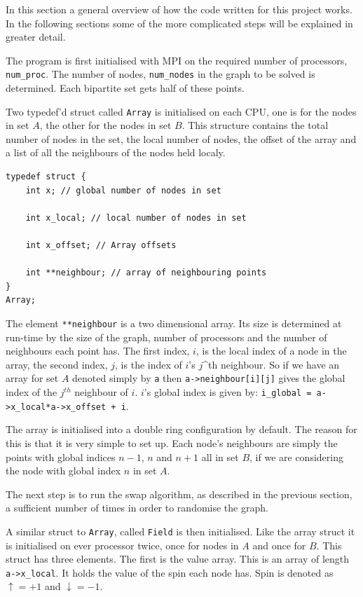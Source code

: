 \documentclass[pdftex,12pt,a4paper]{article}
\begin{document}
In this section a general overview of how the code written for this project works. In the following sections some of the more complicated steps will be explained in greater detail.

The program is first initialised with MPI on the required number of processors, \verb|num_proc|. The number of nodes, \verb|num_nodes| in the graph to be solved is determined. Each bipartite set gets half of these points.

Two typedef'd struct called \verb|Array| is initialised on each CPU, one is for the nodes in set $A$, the other for the nodes in set $B$. This structure contains the total number of nodes in the set, the local number of nodes, the offset of the array and a list of all the neighbours of the nodes held localy.

\begin{lstlisting}
typedef struct {
	int x; // global number of nodes in set

	int x_local; // local number of nodes in set

	int x_offset; // Array offsets

	int **neighbour; // array of neighbouring points
}
Array;
\end{lstlisting}

The element \verb|**neighbour| is a two dimensional array. Its size is determined at run-time by the size of the graph, number of processors and the number of neighbours each point has. The first index, $i$, is the local index of a node in the array, the second index, $j$, is the index of $i$'s $j$^{th} neighbour. So if we have an array for set $A$ denoted simply by \verb|a| then \verb|a->neighbour[i][j]| gives the global index of the $j^{th}$ neighbour of $i$. $i$'s global index is given by: \verb|i_global = a->x_local*a->x_offset + i|.

The array is initialised into a double ring configuration by default. The reason for this is that it is very simple to set up. Each node's neighbours are simply the points with global indices $n-1$, $n$ and $n+1$ all in set $B$, if we are considering the node with global index $n$ in set $A$.


The next step is to run the swap algorithm, as described in the previous section, a sufficient number of times in order to randomise the graph.

A similar struct to \verb|Array|, called \verb|Field| is then initialised. Like the array struct it is initialised on ever processor twice, once for nodes in $A$ and once for $B$. This struct has three elements. The first is the value array. This is an array of length \verb|a->x_local|. It holds the value of the spin each node has. Spin is denoted as $\uparrow = +1$ and $\downarrow = -1$.
\end{document}
